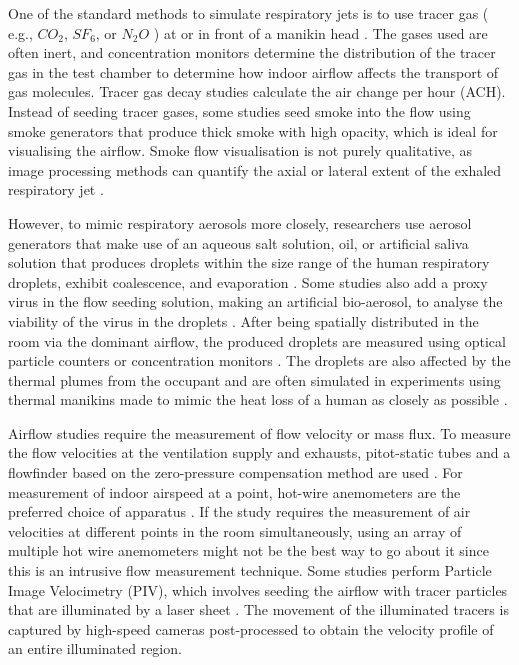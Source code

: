 \documentclass[a4paper,12pt]{elsarticle}
\begin{document}
One of the standard methods to simulate respiratory jets is to use tracer gas ( e.g., $CO_2$, $SF_6$, or $N_2O$ ) at or in front of a manikin head \cite{qian2008dispersion,ren2022practical,lu2022ventilation}. The gases used are often inert, and concentration monitors determine the distribution of the tracer gas in the test chamber to determine how indoor airflow affects the transport of gas molecules. Tracer gas decay studies calculate the air change per hour (ACH). Instead of seeding tracer gases, some studies seed smoke into the flow using smoke generators that produce thick smoke with high opacity, which is ideal for visualising the airflow. Smoke flow visualisation is not purely qualitative, as image processing methods can quantify the axial or lateral extent of the exhaled respiratory jet \cite{saarinen2015large,pan2022boundary}.

However, to mimic respiratory aerosols more closely, researchers use aerosol generators that make use of an aqueous salt solution, oil, or artificial saliva solution that produces droplets within the size range of the human respiratory droplets, exhibit coalescence, and evaporation \cite{zhang2019distribution,zhou2021experimental,jain2023numerical,pan2023predicting}. Some studies also add a proxy virus in the flow seeding solution, making an artificial bio-aerosol, to analyse the viability of the virus in the droplets \cite{oksanen2022combining,liu2020full,liu2023estimating}. After being spatially distributed in the room via the dominant airflow, the produced droplets are measured using optical particle counters or concentration monitors \cite{romano2015numerical,duill2021impact,quintero2022reducing}. The droplets are also affected by the thermal plumes from the occupant and are often simulated in experiments using thermal manikins made to mimic the heat loss of a human as closely as possible \cite{he2011cfd,villafruela2019assessment,li2022airborne,li2023transient}. 

Airflow studies require the measurement of flow velocity or mass flux. To measure the flow velocities at the ventilation supply and exhausts, pitot-static tubes and a flowfinder based on the zero-pressure compensation method are used \cite{li2005role,jiang2009investigating}. For measurement of indoor airspeed at a point, hot-wire anemometers are the preferred choice of apparatus \cite{hang2015potential,qin2023transmission}. If the study requires the measurement of air velocities at different points in the room simultaneously, using an array of multiple hot wire anemometers might not be the best way to go about it since this is an intrusive flow measurement technique. Some studies perform Particle Image Velocimetry (PIV), which involves seeding the airflow with tracer particles that are illuminated by a laser sheet \cite{poussou2010flow,abkarian2020speech,liu2021simulation,faleiros2022tu}. The movement of the illuminated tracers is captured by high-speed cameras post-processed to obtain the velocity profile of an entire illuminated region.
\end{document}
